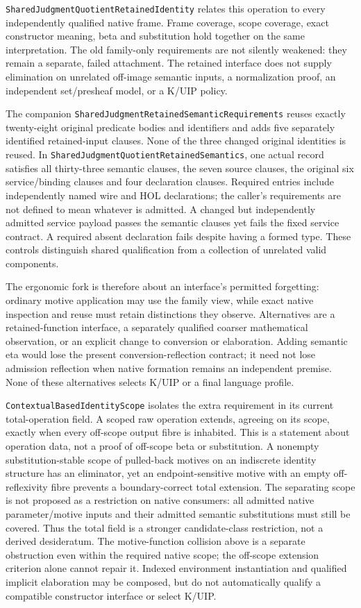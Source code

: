 \documentclass[11pt]{article}
\theoremstyle{definition}
\theoremstyle{remark}
\begin{document}
\nolinkurl{SharedJudgmentQuotientRetainedIdentity} relates this operation
to every independently qualified native frame. Frame coverage, scope
coverage, exact constructor meaning, beta and substitution hold together
on the same interpretation. The old family-only requirements are not
silently weakened: they remain a separate, failed attachment. The retained
interface does not supply elimination on unrelated off-image semantic
inputs, a normalization proof, an independent set/presheaf model, or a
K/UIP policy.

The companion \nolinkurl{SharedJudgmentRetainedSemanticRequirements}
reuses exactly twenty-eight original predicate bodies and identifiers and
adds five separately identified retained-input clauses. None of the three
changed original identities is reused. In
\nolinkurl{SharedJudgmentQuotientRetainedSemantics}, one actual record
satisfies all thirty-three semantic clauses, the seven source clauses,
the original six service/binding clauses and four declaration clauses.
Required entries include independently named wire and HOL declarations;
the caller's requirements are not defined to mean whatever is admitted.
A changed but independently admitted service payload passes the semantic
clauses yet fails the fixed service contract. A required absent declaration
fails despite having a formed type. These controls distinguish shared
qualification from a collection of unrelated valid components.

The ergonomic fork is therefore about an interface's permitted forgetting:
ordinary motive application may use the family view, while exact native
inspection and reuse must retain distinctions they observe. Alternatives
are a retained-function interface, a separately qualified coarser
mathematical observation, or an explicit change to conversion or elaboration.
Adding semantic eta would lose the present conversion-reflection contract;
it need not lose admission reflection when native formation remains an
independent premise. None of these alternatives selects K/UIP or a final
language profile.

\nolinkurl{ContextualBasedIdentityScope} isolates the extra requirement in its
current total-operation field. A scoped raw operation extends, agreeing on its
scope, exactly when every off-scope output fibre is inhabited. This is a
statement about operation data, not a proof of off-scope beta or substitution.
A nonempty substitution-stable scope of pulled-back motives on an indiscrete
identity structure has an eliminator, yet an endpoint-sensitive motive with an
empty off-reflexivity fibre prevents a boundary-correct total extension.
The separating scope is not proposed as a restriction on native consumers:
all admitted native parameter/motive inputs and their admitted semantic
substitutions must still be covered. Thus the total field is a stronger
candidate-class restriction, not a derived desideratum. The motive-function
collision above is a separate obstruction even within the required native
scope; the off-scope extension criterion alone cannot repair it. Indexed
environment instantiation and qualified implicit elaboration may be composed,
but do not automatically qualify a compatible constructor interface or
select K/UIP.
\end{document}
